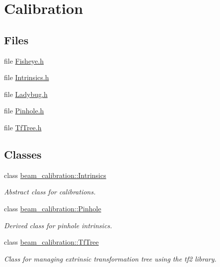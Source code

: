 \hypertarget{group__calibration}{}\section{Calibration}
\label{group__calibration}
\subsection*{Files}
\begin{DoxyCompactItemize}
\item 
file \hyperlink{_fisheye_8h}{Fisheye.\+h}
\item 
file \hyperlink{_intrinsics_8h}{Intrinsics.\+h}
\item 
file \hyperlink{_ladybug_8h}{Ladybug.\+h}
\item 
file \hyperlink{_pinhole_8h}{Pinhole.\+h}
\item 
file \hyperlink{_tf_tree_8h}{Tf\+Tree.\+h}
\end{DoxyCompactItemize}
\subsection*{Classes}
\begin{DoxyCompactItemize}
\item 
class \hyperlink{classbeam__calibration_1_1_intrinsics}{beam\+\_\+calibration\+::\+Intrinsics}
\begin{DoxyCompactList}\small\item\em Abstract class for calibrations. \end{DoxyCompactList}\item 
class \hyperlink{classbeam__calibration_1_1_pinhole}{beam\+\_\+calibration\+::\+Pinhole}
\begin{DoxyCompactList}\small\item\em Derived class for pinhole intrinsics. \end{DoxyCompactList}\item 
class \hyperlink{classbeam__calibration_1_1_tf_tree}{beam\+\_\+calibration\+::\+Tf\+Tree}
\begin{DoxyCompactList}\small\item\em Class for managing extrinsic transformation tree using the tf2 library. \end{DoxyCompactList}\end{DoxyCompactItemize}

